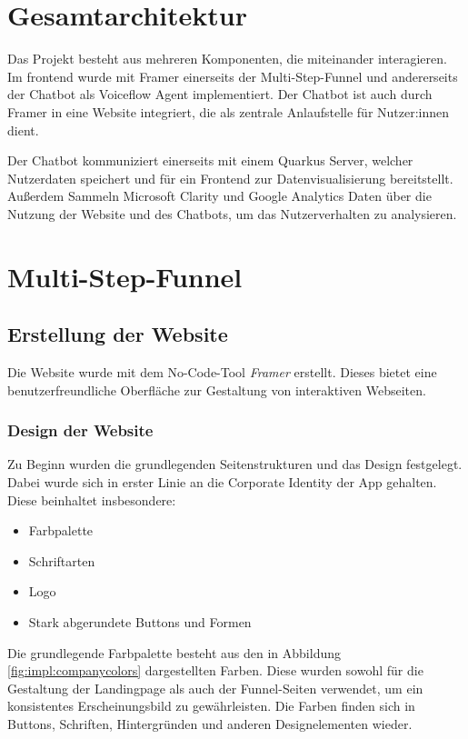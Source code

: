 \section{Gesamtarchitektur}

Das Projekt besteht aus mehreren Komponenten, die miteinander interagieren. 
Im frontend wurde mit Framer einerseits der Multi-Step-Funnel und andererseits
der Chatbot als Voiceflow Agent implementiert. Der Chatbot ist auch durch Framer
in eine Website integriert, die als zentrale Anlaufstelle für Nutzer:innen dient.

Der Chatbot kommuniziert einerseits mit einem Quarkus Server, welcher Nutzerdaten
speichert und für ein Frontend zur Datenvisualisierung bereitstellt.
Außerdem Sammeln Microsoft Clarity und Google Analytics Daten über die Nutzung der
Website und des Chatbots, um das Nutzerverhalten zu analysieren.

\setauthor{\firstauthor}
\section{Multi-Step-Funnel}
\subsection{Erstellung der Website}
Die Website wurde mit dem No-Code-Tool \textit{Framer} erstellt. 
Dieses bietet eine benutzerfreundliche Oberfläche zur Gestaltung 
von interaktiven Webseiten.

\subsubsection{Design der Website}
Zu Beginn wurden die grundlegenden Seitenstrukturen und das Design
festgelegt. Dabei wurde sich in erster Linie an die
Corporate Identity der App gehalten.
Diese beinhaltet insbesondere:
\begin{itemize}
    \item Farbpalette
    \item Schriftarten
    \item Logo
    \item Stark abgerundete Buttons und Formen
\end{itemize}

Die grundlegende Farbpalette besteht aus den in Abbildung \ref{fig:impl:companycolors} 
dargestellten Farben. 
Diese wurden sowohl für die Gestaltung der Landingpage als auch 
der Funnel-Seiten verwendet, um ein konsistentes Erscheinungsbild 
zu gewährleisten.
Die Farben finden sich in Buttons, Schriften, Hintergründen und anderen 
Designelementen wieder.


